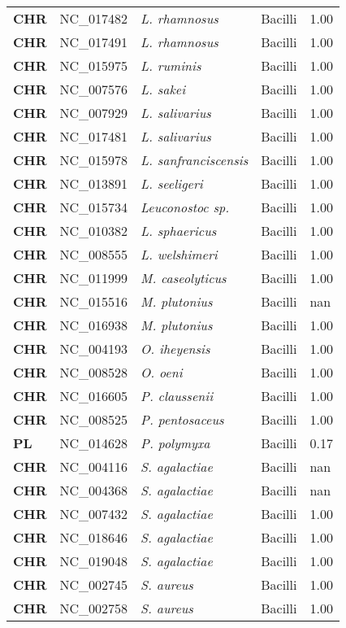 \begin{adjustwidth}{-3cm}{2cm}
{\begin{supertabular}{>{\bfseries}l|p{0.1\textwidth}p{0.14\textwidth}l|l}
CHR & NC\_017482 & \textit{L. rhamnosus} & Bacilli & 1.00\\
CHR & NC\_017491 & \textit{L. rhamnosus} & Bacilli & 1.00\\
CHR & NC\_015975 & \textit{L. ruminis} & Bacilli & 1.00\\
CHR & NC\_007576 & \textit{L. sakei} & Bacilli & 1.00\\
CHR & NC\_007929 & \textit{L. salivarius} & Bacilli & 1.00\\
CHR & NC\_017481 & \textit{L. salivarius} & Bacilli & 1.00\\
CHR & NC\_015978 & \textit{L. sanfranciscensis} & Bacilli & 1.00\\
CHR & NC\_013891 & \textit{L. seeligeri} & Bacilli & 1.00\\
CHR & NC\_015734 & \textit{Leuconostoc sp.} & Bacilli & 1.00\\
CHR & NC\_010382 & \textit{L. sphaericus} & Bacilli & 1.00\\
CHR & NC\_008555 & \textit{L. welshimeri} & Bacilli & 1.00\\
CHR & NC\_011999 & \textit{M. caseolyticus} & Bacilli & 1.00\\
CHR & NC\_015516 & \textit{M. plutonius} & Bacilli & nan\\
CHR & NC\_016938 & \textit{M. plutonius} & Bacilli & 1.00\\
CHR & NC\_004193 & \textit{O. iheyensis} & Bacilli & 1.00\\
CHR & NC\_008528 & \textit{O. oeni} & Bacilli & 1.00\\
CHR & NC\_016605 & \textit{P. claussenii} & Bacilli & 1.00\\
CHR & NC\_008525 & \textit{P. pentosaceus} & Bacilli & 1.00\\
PL & NC\_014628 & \textit{P. polymyxa} & Bacilli & 0.17\\
CHR & NC\_004116 & \textit{S. agalactiae} & Bacilli & nan\\
CHR & NC\_004368 & \textit{S. agalactiae} & Bacilli & nan\\
CHR & NC\_007432 & \textit{S. agalactiae} & Bacilli & 1.00\\
CHR & NC\_018646 & \textit{S. agalactiae} & Bacilli & 1.00\\
CHR & NC\_019048 & \textit{S. agalactiae} & Bacilli & 1.00\\
CHR & NC\_002745 & \textit{S. aureus} & Bacilli & 1.00\\
CHR & NC\_002758 & \textit{S. aureus} & Bacilli & 1.00\\

\end{supertabular}}
\end{adjustwidth}
